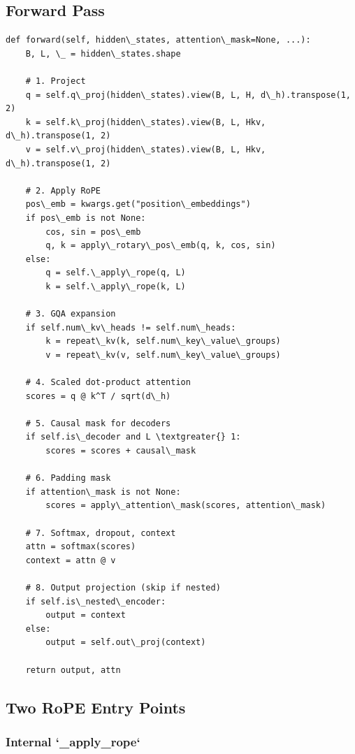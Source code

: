\subsection{Forward Pass}

\begin{lstlisting}
def forward(self, hidden\_states, attention\_mask=None, ...):
    B, L, \_ = hidden\_states.shape
    
    # 1. Project
    q = self.q\_proj(hidden\_states).view(B, L, H, d\_h).transpose(1, 2)
    k = self.k\_proj(hidden\_states).view(B, L, Hkv, d\_h).transpose(1, 2)
    v = self.v\_proj(hidden\_states).view(B, L, Hkv, d\_h).transpose(1, 2)
    
    # 2. Apply RoPE
    pos\_emb = kwargs.get("position\_embeddings")
    if pos\_emb is not None:
        cos, sin = pos\_emb
        q, k = apply\_rotary\_pos\_emb(q, k, cos, sin)
    else:
        q = self.\_apply\_rope(q, L)
        k = self.\_apply\_rope(k, L)
    
    # 3. GQA expansion
    if self.num\_kv\_heads != self.num\_heads:
        k = repeat\_kv(k, self.num\_key\_value\_groups)
        v = repeat\_kv(v, self.num\_key\_value\_groups)
    
    # 4. Scaled dot-product attention
    scores = q @ k^T / sqrt(d\_h)
    
    # 5. Causal mask for decoders
    if self.is\_decoder and L \textgreater{} 1:
        scores = scores + causal\_mask
    
    # 6. Padding mask
    if attention\_mask is not None:
        scores = apply\_attention\_mask(scores, attention\_mask)
    
    # 7. Softmax, dropout, context
    attn = softmax(scores)
    context = attn @ v
    
    # 8. Output projection (skip if nested)
    if self.is\_nested\_encoder:
        output = context
    else:
        output = self.out\_proj(context)
    
    return output, attn
\end{lstlisting}

\subsection{Two RoPE Entry Points}

\subsubsection{Internal `\_apply\_rope`}

